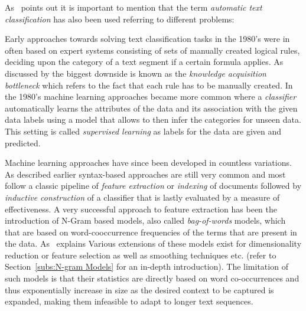 As~\cite{Sebastiani:2002aa} points out it is important to mention that the term \emph{automatic text classification} has also been used referring to different problems: ~\cite{Sebastiani:2002aa}

Early approaches towards solving text classification tasks in the 1980's were in often based on expert systems consisting of sets of manually created logical rules, deciding upon the category of a text segment if a certain formula applies. As discussed by \cite{Sebastiani:2002aa} the biggest downside is known as the \emph{knowledge acquisition bottleneck} which refers to the fact that each rule has to be manually created. In the 1980's machine learning approaches became more common where a \emph{classifier} automatically learns the attributes of the data and its association with the given data labels using a model that allows to then infer the categories for unseen data. This setting is called \emph{supervised learning} as labels for the data are given and predicted.

Machine learning approaches have since been developed in countless variations. As described earlier syntax-based approaches are still very common and most follow a classic pipeline of \emph{feature extraction} or \emph{indexing} of documents followed by \emph{inductive construction} of a classifier that is lastly evaluated by a measure of effectiveness. A very successful approach to feature extraction has been the introduction of N-Gram based models, also called \emph{bag-of-words} models, which that are based on word-cooccurrence frequencies of the terms that are present in the data.
As~\cite{Mikolov:2012aa} explains 
Various extensions of these models exist for dimensionality reduction or feature selection as well as smoothing techniques etc. (refer to Section~\ref{subs:N-gram Models} for an in-depth introduction). The limitation of such models is that their statistics are directly based on word co-occurrences and thus exponentially increase in size as the desired context to be captured is expanded, making them infeasible to adapt to longer text sequences.

